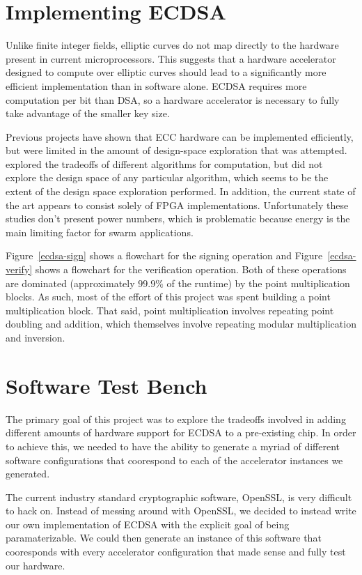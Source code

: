 \documentclass[twocolumn]{article}
\begin{document}
\section{Implementing ECDSA}

Unlike finite integer fields, elliptic curves do not map directly to
the hardware present in current microprocessors\cite{kss-ecdsa}. This
suggests that a hardware accelerator designed to compute over elliptic
curves should lead to a significantly more efficient implementation
than in software alone.  ECDSA requires more computation per bit than
DSA, so a hardware accelerator is necessary to fully take advantage of
the smaller key size.

Previous projects\cite{nnll-ecdsa_hw} have shown that ECC hardware can
be implemented efficiently, but were limited in the amount of
design-space exploration that was attempted.  \cite{mmm-hw_ecc}
explored the tradeoffs of different algorithms for computation, but
did not explore the design space of any particular algorithm, which
seems to be the extent of the design space exploration performed.  In
addition, the current state of the art appears to consist solely of
FPGA implementations.  Unfortunately these studies don't present power
numbers, which is problematic because energy is the main limiting
factor for swarm applications.

Figure~\ref{ecdsa-sign} shows a flowchart for the signing operation
and Figure~\ref{ecdsa-verify} shows a flowchart for the verification
operation.  Both of these operations are dominated (approximately
$99.9\%$ of the runtime) by the point multiplication blocks.  As such,
most of the effort of this project was spent building a point
multiplication block.  That said, point multiplication involves
repeating point doubling and addition, which themselves involve
repeating modular multiplication and inversion.

\section{Software Test Bench}

The primary goal of this project was to explore the tradeoffs involved
in adding different amounts of hardware support for ECDSA to a
pre-existing chip.  In order to achieve this, we needed to have the
ability to generate a myriad of different software configurations that
coorespond to each of the accelerator instances we generated.

The current industry standard cryptographic software, OpenSSL, is very
difficult to hack on.  Instead of messing around with OpenSSL, we
decided to instead write our own implementation of ECDSA with the
explicit goal of being paramaterizable.  We could then generate an
instance of this software that cooresponds with every accelerator
configuration that made sense and fully test our hardware.
\end{document}
